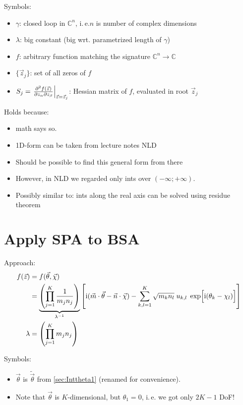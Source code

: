 \documentclass[
	english,
	a4paper,
	fontsize=10pt,
	parskip=half,
	titlepage=true,
	DIV=12,
	final
]{scrreprt}
\newcommand*{\ie}{i.\,e.\xspace}
\newcommand*{\thus}{\ensuremath{\rightarrow}\xspace}
\newcommand*{\iunit}{\ensuremath{\mathrm{i}}}
\newcommand*{\setComplex}  {\ensuremath{\mathbb{C}}}
\begin{document}
Symbols:
\begin{itemize}
\item $\gamma$: closed loop in $\setComplex^{n}$, \ie $n$ is number of complex dimensions
\item $\lambda$: big constant (big wrt. parametrized length of $\gamma$)
\item $f$: arbitrary function matching the signature $\setComplex^{n} \thus \setComplex$
\item $\{ \vec{z}_j \}$: set of all zeros of $f$
\item $S_j = \eval{ \pdv{f(\vec{z})}{z_\alpha}{z_\beta}  }_{\vec{z} = \vec{z}_j} $:
	Hessian matrix of $f$, evaluated in root $\vec{z}_j$
\end{itemize}

Holds because:
\begin{itemize}
\item math says so.
\item 1D-form can be taken from lecture notes NLD
\item Should be possible to find this general form from there
\item However, in NLD we regarded only ints over $(-\infty; +\infty)$.
\item Possibly similar to: ints along the real axis can be solved using residue theorem
\end{itemize}

\section{Apply SPA to BSA}
Approach:
\begin{align}
\nonumber
	f(\vec{z})
&=
	f(\vec{\theta}, \vec{\chi}) \\
&=
	\underbrace{
		\qty( \prod_{j=1}^{K}
			\frac{1}{m_j n_j}
		)
	}_{\lambda^{-1}}
	\qty[
		\iunit(\vec{m} \cdot \vec{\theta} - \vec{n} \cdot \vec{\chi})
		-
		\sum_{k,l=1}^{K}
			\sqrt{m_k n_l} \; u_{k,l} \; \exp[ \Big. \iunit(\theta_k - \chi_l)]
	]
\label{eqn:DefF}
\\
	\lambda
&=
	\qty( \prod_{j=1}^{K} m_j n_j)
\label{eqn:DefLambda}
\end{align}

\newpage
Symbols:
\begin{itemize}
\item $\vec{\theta}$ is $\tilde{\vec{\theta}}$ from \ref{sec:Inttheta1} (renamed for convenience).
\item Note that $\vec{\theta}$ is $K$-dimensional, but $\theta_1 = 0$, \ie we got only $2K - 1$ DoF!
\end{itemize}
\end{document}
